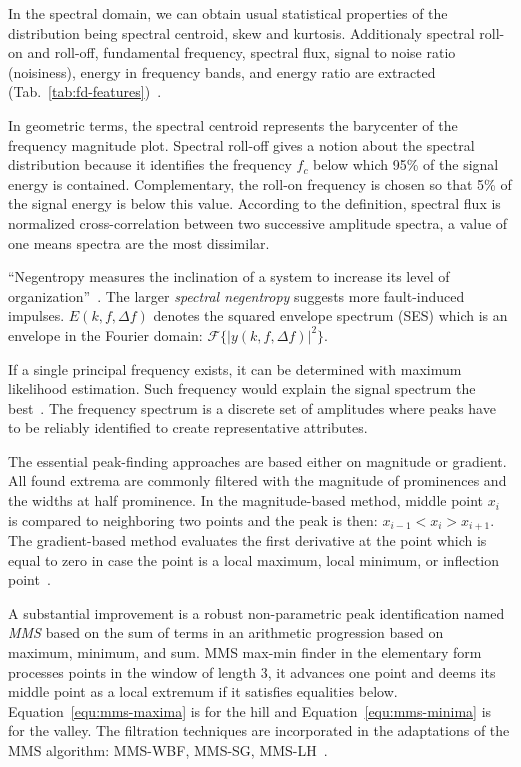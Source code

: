In the spectral domain, we can obtain usual statistical properties of the distribution being spectral centroid, skew and kurtosis. Additionaly spectral roll-on and roll-off, fundamental frequency, spectral flux, signal to noise ratio (noisiness), energy in frequency bands, and energy ratio are extracted (Tab.~\ref{tab:fd-features})~\cite{peeters_large_2004}. 

In geometric terms, the spectral centroid represents the barycenter of the frequency magnitude plot. Spectral roll-off gives a notion about the spectral distribution because it identifies the frequency $f_c$ below which 95\% of the signal energy is contained. Complementary, the roll-on frequency is chosen so that 5\% of the signal energy is below this value. According to the definition, spectral flux is normalized cross-correlation between two successive amplitude spectra, a value of one means spectra are the most dissimilar.

``Negentropy measures the inclination of a system to increase its level of organization''~\cite{avoci_spectral_2020}. The larger \emph{spectral negentropy} suggests more fault-induced impulses. $E(k, f, \Delta f)$ denotes the squared envelope spectrum (SES) which is an envelope in the Fourier domain: $\mathcal{F}\{ |y(k, f, \Delta f)|^2 \}$.

If a single principal frequency exists, it can be determined with maximum likelihood estimation. Such frequency would explain the signal spectrum the best~\cite{peeters_large_2004}.  The frequency spectrum is a discrete set of amplitudes where peaks have to be reliably identified to create representative attributes.

The essential peak-finding approaches are based either on magnitude or gradient. All found extrema are commonly filtered with the magnitude of prominences and the widths at half prominence. In the magnitude-based method, middle point $x_i$ is compared to neighboring two points and the peak is then: $x_{i-1} < x_i > x_{i+1}$. The gradient-based method evaluates the first derivative at the point which is equal to zero in case the point is a local maximum, local minimum, or inflection point~\cite{adikaram_non-parametric_2016}.

A substantial improvement is a robust non-parametric peak identification named \emph{MMS} based on the sum of terms in an arithmetic progression based on maximum, minimum, and sum. MMS max-min finder in the elementary form processes points in the window of length 3, it advances one point and deems its middle point as a local extremum if it satisfies equalities below. Equation~\ref{equ:mms-maxima} is for the hill and Equation~\ref{equ:mms-minima} is for the valley. The filtration techniques are incorporated in the adaptations of the MMS algorithm: MMS-WBF, MMS-SG, MMS-LH~\cite{adikaram_non-parametric_2016}.


